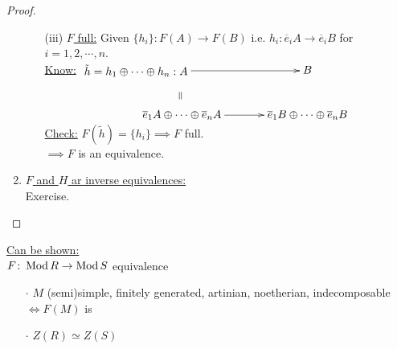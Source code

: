 \begin{thm}
\begin{proof}
\begin{enumerate}
\begin{enumerate}
\item[(iii)] \underline{$F$ full:} Given $\{ h_i \}\colon  F(A) \to F(B)$ i.e. $h_i \colon  \overline{e}_i A \to \overline{e}_iB$ for $i = 1, 2, \cdots , n$.\\
\underline{Know:} $\xymatrix{
*+[l]{\tilde{h} = h_1 \oplus \cdots \oplus h_n : A} \ar@{}[d]|-*[@]{=} \ar[r] & B\\
 \overline{e}_1A \oplus \cdots \oplus \overline{e}_nA \ar[r] & \overline{e}_1B \oplus \cdots \oplus \overline{e}_nB
}$\\
\underline{Check:} $F(\tilde{h}) = \{ h_i \} \implies F$ full.\\
$\implies F$ is an equivalence.
\end{enumerate}
\item \underline{$F$ and $H$ ar inverse equivalences:}\\
Exercise.
\end{enumerate}
\end{proof}

\end{thm}

\underline{Can be shown:}\\
$F\colon  \operatorname{Mod} R \to \operatorname{Mod} S$ equivalence
\begin{enumerate}
\item[$\cdot$] $M$ (semi)simple, finitely generated, artinian, noetherian, indecomposable\\
$\iff F(M)$ is
\item[$\cdot$] $Z(R) \simeq Z(S)$ 
\end{enumerate}